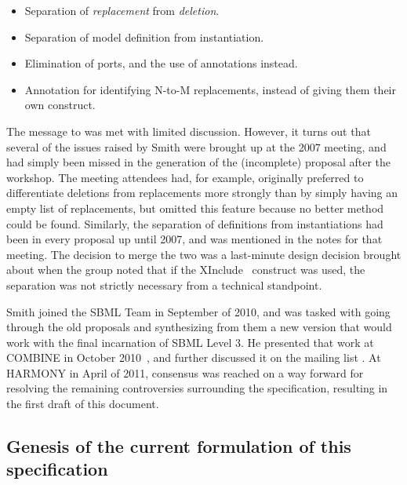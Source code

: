 \begin{itemize}\setlength{\parskip}{0ex}

\item Separation of \emph{replacement} from \emph{deletion}.

\item Separation of model definition from instantiation.

\item Elimination of ports, and the use of annotations instead.

\item Annotation for identifying N-to-M replacements, instead of giving them their own construct.

\end{itemize}

The message to  was met with limited discussion.  However, it turns out that several of the issues raised by Smith were brought up at the 2007 meeting, and had simply been missed in the generation of the (incomplete) proposal after the workshop.  The meeting attendees had, for example, originally preferred to differentiate deletions from replacements more strongly than by simply having an empty list of replacements, but omitted this feature because no better method could be found.  Similarly, the separation of definitions from instantiations had been in every proposal up until 2007, and was mentioned in the notes for that meeting.  The decision to merge the two was a last-minute design decision brought about when the group noted that if the XInclude~\citep{xinclude} construct was used, the separation was not strictly necessary from a technical standpoint.

Smith joined the SBML Team in September of 2010, and was tasked with going through the old proposals and synthesizing from them a new version that would work with the final incarnation of SBML Level 3.  He presented that work at COMBINE in October 2010~\citep{smith:2010c}, and further discussed it on the mailing list .  At HARMONY in April of 2011, consensus was reached on a way forward for resolving the remaining controversies surrounding the specification, resulting in the first draft of this document.

\subsection{Genesis of the current formulation of this specification}

